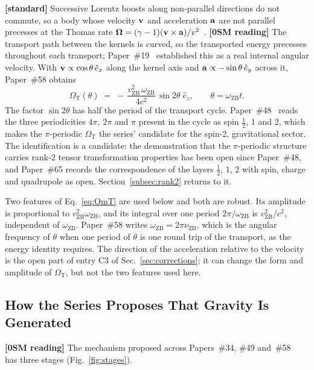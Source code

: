 \documentclass[%
 reprint, amsmath,amssymb, aps, prb, ]{revtex4-2}
\numberwithin{equation}{section}
\newcommand{\iphase}{\theta}
\newcommand{\omZB}{\omega_{\text{ZB}}}
\newcommand{\vZB}{v_{\text{ZB}}}
\newcommand{\nuZB}{\nu_{\text{ZB}}}
\newcommand{\OmT}{\Omega_{\text{T}}}
\newcommand{\ehat}[1]{\hat{e}_{#1}}
\begin{document}
\textbf{[standard]} Successive Lorentz boosts along non-parallel directions do not commute, so a body whose velocity $\vb{v}$ and acceleration $\vb{a}$ are not parallel precesses at the Thomas rate $\bm{\Omega} = (\gamma - 1)(\vb{v}\times\vb{a})/v^{2}$~\cite{Thomas1926,Jackson1999}. \textbf{[0SM reading]} The transport path between the kernels is curved, so the transported energy precesses throughout each transport; Paper~\#19~\cite{hanamura19} established this as a real internal angular velocity. With $\vb{v} \propto \cos\iphase\,\ehat{x}$ along the kernel axis and $\vb{a} \propto -\sin\iphase\,\ehat{y}$ across it, Paper~\#58 obtains
\begin{equation}
\OmT(\iphase) \;=\; -\,\frac{\vZB^{2}\,\omZB}{4c^{2}}\,\sin 2\iphase\;\ehat{z}, \qquad \iphase = \omZB t .
\label{eq:OmT}
\end{equation}
The factor $\sin 2\iphase$ has half the period of the transport cycle. Paper~\#48~\cite{hanamura48} reads the three periodicities $4\pi$, $2\pi$ and $\pi$ present in the cycle as spin $\tfrac12$, $1$ and $2$, which makes the $\pi$-periodic $\OmT$ the series' candidate for the spin-2, gravitational sector. The identification is a candidate: the demonstration that the $\pi$-periodic structure carries rank-2 tensor transformation properties has been open since Paper~\#48, and Paper~\#65 records the correspondence of the layers $\tfrac12$, $1$, $2$ with spin, charge and quadrupole as open. Section~\ref{subsec:rank2} returns to it.

Two features of Eq.~\eqref{eq:OmT} are used below and both are robust. Its amplitude is proportional to $\vZB^{2}\omZB$, and its integral over one period $2\pi/\omZB$ is $\vZB^{2}/c^{2}$, independent of $\omZB$. Paper~\#58 writes $\omZB = 2\pi\nuZB$, which is the angular frequency of $\iphase$ when one period of $\iphase$ is one round trip of the transport, as the energy identity requires. The direction of the acceleration relative to the velocity is the open part of entry C3 of Sec.~\ref{sec:corrections}; it can change the form and amplitude of $\OmT$, but not the two features used here.

\subsection{How the Series Proposes That Gravity Is Generated}
\label{subsec:primer_gravity}

\textbf{[0SM reading]} The mechanism proposed across Papers~\#34, \#49 and~\#58~\cite{hanamura34,hanamura49,hanamura58} has three stages (Fig.~\ref{fig:stages}).
\end{document}
